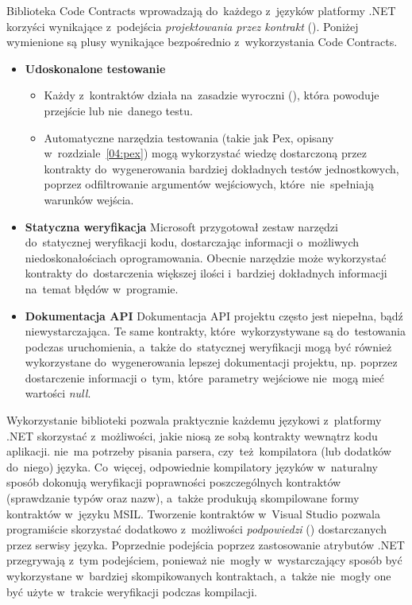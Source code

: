 Biblioteka Code Contracts wprowadzają do~każdego z~języków platformy .NET korzyści wynikające z~podejścia \emph{projektowania przez kontrakt} (). Poniżej wymienione są plusy wynikające bezpośrednio z~wykorzystania Code Contracts.

\begin{itemize}
	\item \textbf{Udoskonalone testowanie}
		\begin{itemize}
			\item Każdy z~kontraktów działa na~zasadzie wyroczni (), która powoduje przejście lub nie~danego testu.
			\item Automatyczne narzędzia testowania (takie jak Pex, opisany w~rozdziale~\ref{04:pex}) mogą wykorzystać wiedzę dostarczoną przez kontrakty do~wygenerowania bardziej dokładnych testów jednostkowych, poprzez odfiltrowanie argumentów wejściowych, które~nie~spełniają warunków wejścia.
		\end{itemize}
	\item \textbf{Statyczna weryfikacja}
		Microsoft przygotował zestaw narzędzi do~statycznej weryfikacji kodu, dostarczając informacji o~możliwych niedoskonałościach oprogramowania. Obecnie narzędzie może wykorzystać kontrakty do~dostarczenia większej ilości i~bardziej dokładnych informacji na~temat błędów w~programie.
	\item \textbf{Dokumentacja API}
		Dokumentacja API projektu często jest niepełna, bądź niewystarczająca. Te same kontrakty, które~wykorzystywane są do~testowania podczas uruchomienia, a~także do~statycznej weryfikacji mogą być również wykorzystane do~wygenerowania lepszej dokumentacji projektu, np. poprzez dostarczenie informacji o~tym, które~parametry wejściowe nie~mogą mieć wartości \emph{null}.
\end{itemize}

Wykorzystanie biblioteki pozwala praktycznie każdemu językowi z~platformy .NET skorzystać z~możliwości, jakie niosą ze sobą kontrakty wewnątrz kodu aplikacji. nie~ma potrzeby pisania parsera, czy~też~kompilatora (lub dodatków do~niego) języka. Co~więcej, odpowiednie kompilatory języków w~naturalny sposób dokonują weryfikacji poprawności poszczególnych kontraktów (sprawdzanie typów oraz nazw), a~także produkują skompilowane formy kontraktów w~języku MSIL. Tworzenie kontraktów w~Visual Studio pozwala programiście skorzystać dodatkowo z~możliwości \emph{podpowiedzi} () dostarczanych przez serwisy języka. Poprzednie podejścia poprzez zastosowanie atrybutów .NET przegrywają z~tym podejściem, ponieważ nie~mogły w~wystarczający sposób być wykorzystane w~bardziej skompikowanych kontraktach, a~także nie~mogły one być użyte w~trakcie weryfikacji podczas kompilacji.

